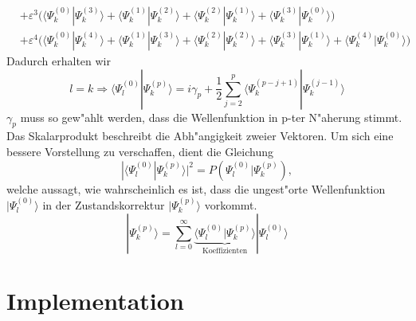 \begin{refsection}
\begin{align*}
&+\varepsilon^3\bigl(\langle\Psi_k^{(0)}|\Psi_k^{(3)}\rangle
+\langle\Psi_k^{(1)}|\Psi_k^{(2)}\rangle
+\langle\Psi_k^{(2)}|\Psi_k^{(1)}\rangle
+\langle\Psi_k^{(3)}|\Psi_k^{(0)}\rangle\bigr)
\\
&+\varepsilon^4\bigl(\langle\Psi_k^{(0)}|\Psi_k^{(4)}\rangle
+\langle\Psi_k^{(1)}|\Psi_k^{(3)}\rangle
+\langle\Psi_k^{(2)}|\Psi_k^{(2)}\rangle
+\langle\Psi_k^{(3)}|\Psi_k^{(1)}\rangle
+\langle\Psi_k^{(4)}|\Psi_k^{(0)}\rangle\bigr)
\end{align*}
Dadurch erhalten wir
\begin{equation}
l=k
\Rightarrow
\langle\Psi_l^{(0)}|\Psi_k^{(p)}\rangle
=
i\gamma_p+
\frac12 \displaystyle\sum_{j=2}^{p} 
\langle\Psi_k^{(p-j+1)}|\Psi_k^{(j-1)}\rangle
\end{equation}
$\gamma_p$ muss so gew"ahlt werden, dass die Wellenfunktion in p-ter N"aherung stimmt.
Das Skalarprodukt beschreibt die Abh"angigkeit zweier Vektoren.
Um sich eine bessere Vorstellung zu verschaffen, dient die Gleichung
\[
|\langle\Psi_l^{(0)}|\Psi_k^{(p)}\rangle|^2
=
P(\Psi_l^{(0)}|\Psi_k^{(p)}),
\]
welche aussagt, wie wahrscheinlich es ist,
dass die ungest"orte Wellenfunktion $|\Psi_l^{(0)}\rangle$
in der Zustandskorrektur $|\Psi_k^{(p)}\rangle$ vorkommt.
\begin{equation}
|\Psi_k^{(p)}\rangle
=
\displaystyle\sum_{l=0}^{\infty}
\underbrace{\langle\Psi_l^{(0)}|\Psi_k^{(p)}\rangle}_{\text{Koeffizienten}}
|\Psi_l^{(0)}\rangle
\end{equation}

\section{Implementation}


\end{refsection}
